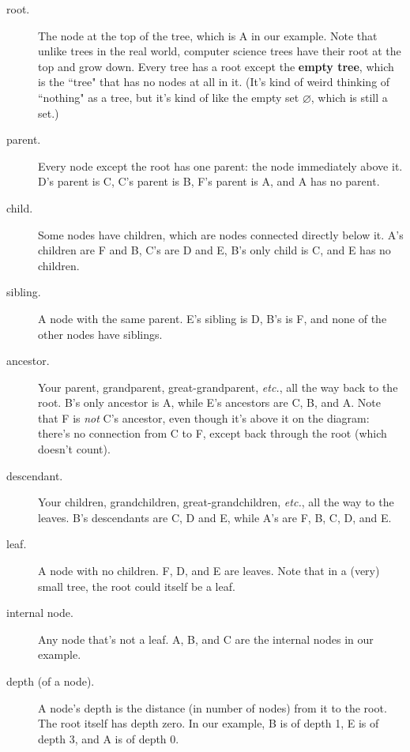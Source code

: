 \begin{description}
\item[root.] The node at the top of the tree, which is A in our example.
Note that unlike trees in the real world, computer science trees have their
root at the top and grow down. Every tree has a root except the
\textbf{empty tree}, which is the ``tree" that has no nodes at all in it.
(It's kind of weird thinking of ``nothing" as a tree, but it's kind of like
the empty set $\varnothing$, which is still a set.) 

\item[parent.] Every node except the root has one parent: the node
immediately above it. D's parent is C, C's parent is B, F's parent is A,
and A has no parent.

\item[child.] Some nodes have children, which are nodes connected directly
below it. A's children are F and B, C's are D and E, B's only child is C,
and E has no children.

\item[sibling.] A node with the same parent. E's sibling is D, B's is F,
and none of the other nodes have siblings.

\item[ancestor.] Your parent, grandparent, great-grandparent,
\textit{etc.}, all the way back to the root. B's only ancestor is A, while
E's ancestors are C, B, and A. Note that F is \textit{not} C's ancestor,
even though it's above it on the diagram: there's no connection from C to
F, except back through the root (which doesn't count).

\item[descendant.] Your children, grandchildren, great-grandchildren,
\textit{etc.}, all the way to the leaves. B's descendants are C, D and E,
while A's are F, B, C, D, and E. 

\item[leaf.] A node with no children. F, D, and E are leaves. Note that in
a (very) small tree, the root could itself be a leaf.

\item[internal node.] Any node that's not a leaf. A, B, and C are the
internal nodes in our example.

\item[depth (of a node).] A node's depth is the distance (in number of
nodes) from it to the root. The root itself has depth zero. In our example,
B is of depth 1, E is of depth 3, and A is of depth 0.


\end{description}
